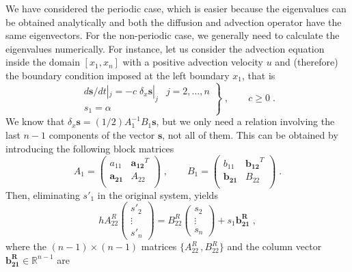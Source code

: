 {We have considered the periodic case, which is easier because the eigenvalues can be obtained analytically and both the diffusion and advection operator have the same eigenvectors. For the non-periodic case, we generally need to calculate the eigenvalues numerically.  For instance, let us consider the advection equation inside the domain $[x_1,x_n]$ with a positive advection velocity $u$ and (therefore) the boundary condition imposed at the left boundary $x_1$, that is
\begin{equation}
  \left.\begin{array}{ll}
  d\mathbf{s}/dt|_j = -c\; \delta_x \mathbf{s}|_j & j=2,\ldots,n\\
  s_1=\alpha
  \end{array}\right\} \;,\qquad c\ge 0  \;.
  \label{equ:problem2}
\end{equation}
We know that $\delta_x \mathbf{s} = (1/2)A_1^{-1}B_1\mathbf{s}$, but we only need a relation involving the last $n-1$ components of the vector $\mathbf{s}$, not all of them. This can be obtained by introducing the following block matrices \citep{Lomax:1998,Mellado:2012}
\begin{equation*}
  A_1=
  \left(\begin{array}{cc}a_{11}&\mathbf{a_{12}}^T \\\mathbf{a_{21}}   &A_{22}\\
  \end{array}\right) \;, \qquad
  B_1=
  \left(\begin{array}{cc}b_{11}&\mathbf{b_{12}}^T \\\mathbf{b_{21}}   &B_{22}\\
  \end{array}\right) \;.
\end{equation*}
Then, eliminating $s'_1$ in the original system, yields
\begin{equation}
  hA^R_{22}
  \left(\begin{array}{c}s'_2\\\vdots\\s'_n\end{array}\right) =
  B^R_{22}\left(\begin{array}{c}s_2\\\vdots\\s_n\end{array}\right)+
  s_1\mathbf{b^R_{21}} \;,
\end{equation}
where the $(n-1)\times (n-1)$ matrices $\{A^R_{22}\,,B^R_{22}\}$ and the column vector $\mathbf{b^R_{21}}\in\mathbb{R}^{n-1}$ are
}
